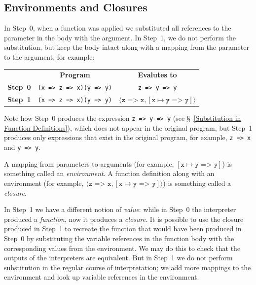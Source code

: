 \documentclass[12pt, oneside]{book}
\begin{document}
\subsection{Environments and Closures}

In Step~0, when a function was applied we substituted all references to the parameter in the body with the argument. In Step~1, we do not perform the substitution, but keep the body intact along with a mapping from the parameter to the argument, for example:

\begin{center}
\begin{tabular}{rcc}
& \textbf{Program} & \textbf{Evalutes to} \\
\textbf{Step~0} & \texttt{(x => z => x)(y => y)} & \texttt{z => y => y} \\
\textbf{Step~1} & \texttt{(x => z => x)(y => y)} & $\langle \texttt{z => x}, [\texttt{x}\mapsto\texttt{y => y}] \rangle$ \\
\end{tabular}
\end{center}

Note how Step~0 produces the expression \texttt{z => y => y} (see §~\ref{Substitution in Function Definitions}), which does not appear in the original program, but Step~1 produces only expressions that exist in the original program, for example, \texttt{z => x} and \texttt{y => y}.

\begin{mdframed}[frametitle = {Technical Terms}]
A mapping from parameters to arguments (for example, $[\texttt{x}\mapsto\texttt{y => y}]$) is something called an \emph{environment}. A function definition along with an environment (for example, $\langle \texttt{z => x}, [\texttt{x}\mapsto\texttt{y => y}] \rangle$) is something called a \emph{closure}.
\end{mdframed}

In Step~1 we have a different notion of \emph{value}: while in Step~0 the interpreter produced a \emph{function}, now it produces a \emph{closure}. It is possible to use the closure produced in Step~1 to recreate the function that would have been produced in Step~0 by substituting the variable references in the function body with the corresponding values from the environment. We may do this to check that the outputs of the interpreters are equivalent. But in Step~1 we do not perform substitution in the regular course of interpretation; we add more mappings to the environment and look up variable references in the environment.
\end{document}
